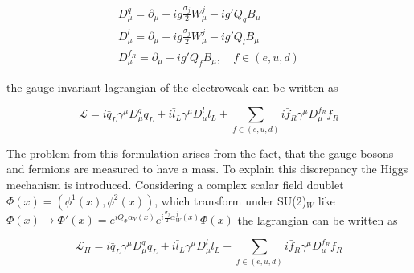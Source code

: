 \begin{equation}
	\begin{split}
		D^{q}_{\mu} = \partial_{\mu}  - ig\frac{\sigma_{j}}{2}W^{j}_{\mu} - ig'Q_{q}B_{\mu} \\
		D^{l}_{\mu} = \partial_{\mu}  - ig\frac{\sigma_{j}}{2}W^{j}_{\mu} - ig'Q_{l}B_{\mu} \\
		D^{f_R}_{\mu} = \partial_{\mu}  - ig'Q_{f}B_{\mu}, \quad f \in (e, u, d)
	\end{split}
\end{equation}

the gauge invariant lagrangian of the electroweak can be written as 

\begin{equation}
	\mathcal{L} = i\bar{q}_{L}\gamma^{\mu}D_{\mu}^{q}q_{L} + i\bar{l}_{L}\gamma^{\mu}D_{\mu}^{l}l_{L} + \sum_{f \in (e, u, d)} i\bar{f}_{R}\gamma^{\mu}D^{f_R}_{\mu}f_{R}
\end{equation}

The problem from this formulation arises from the fact, that the gauge bosons and fermions are measured to have a mass. To explain this discrepancy the Higgs mechanism is introduced. Considering a complex scalar field doublet $\Phi(x) = (\phi^{1}(x), \phi^{2}(x))$, which transform under SU(2)$_{W}$ like $\Phi(x) \rightarrow \Phi'(x) = e^{iQ_{\Phi} \alpha_{Y}(x)} e^{i\frac{\sigma_{j}}{2}\alpha^{j}_{W}(x)}\Phi(x)$ the lagrangian can be written as

\begin{equation}
	\mathcal{L}_{H} = i\bar{q}_{L}\gamma^{\mu}D_{\mu}^{q}q_{L} + i\bar{l}_{L}\gamma^{\mu}D_{\mu}^{l}l_{L} + \sum_{f \in (e, u, d)} i\bar{f}_{R}\gamma^{\mu}D^{f_R}_{\mu}f_{R}
\end{equation}

